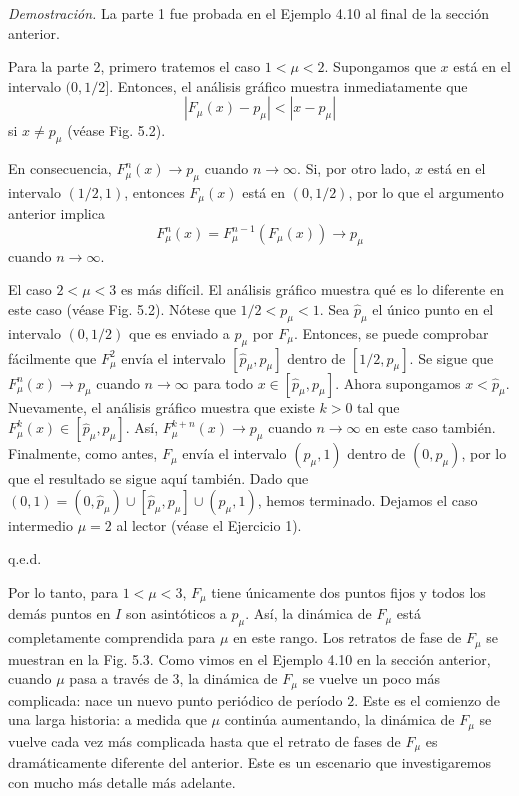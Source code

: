 \documentclass[10pt,a4paper]{book}
\begin{document}
\emph{Demostración.}  
La parte 1 fue probada en el Ejemplo 4.10 al final de la sección anterior.  

Para la parte 2, primero tratemos el caso $1<\mu<2$.  
Supongamos que $x$ está en el intervalo $(0,1/2]$.  
Entonces, el análisis gráfico muestra inmediatamente que 
\[
|F_{\mu}(x)-p_{\mu}| < |x-p_{\mu}|
\]
si $x \neq p_{\mu}$ (véase Fig. 5.2).  

En consecuencia, $F_{\mu}^{n}(x) \to p_{\mu}$ cuando $n\to\infty$.  
Si, por otro lado, $x$ está en el intervalo $(1/2,1)$, entonces $F_{\mu}(x)$ está en $(0,1/2)$, 
por lo que el argumento anterior implica
\[
F_{\mu}^{n}(x)=F_{\mu}^{n-1}(F_{\mu}(x)) \to p_{\mu}
\]
cuando $n\to\infty$.

\medskip

El caso $2<\mu<3$ es más difícil. El análisis gráfico muestra qué es lo diferente en este caso (véase Fig. 5.2). Nótese que $1/2<p_{\mu}<1$. Sea $\hat{p}_{\mu}$ el único punto en el intervalo $(0,1/2)$ que es enviado a $p_{\mu}$ por $F_{\mu}$. Entonces, se puede comprobar fácilmente que $F_{\mu}^{2}$ envía el intervalo $[\hat{p}_{\mu},p_{\mu}]$ dentro de $[1/2,p_{\mu}]$. Se sigue que $F_{\mu}^{n}(x)\to p_{\mu}$ cuando $n\to\infty$ para todo $x\in[\hat{p}_{\mu},p_{\mu}]$. Ahora supongamos $x<\hat{p}_{\mu}$. Nuevamente, el análisis gráfico muestra que existe $k>0$ tal que $F_{\mu}^{k}(x)\in[\hat{p}_{\mu},p_{\mu}]$. Así, $F_{\mu}^{k+n}(x)\to p_{\mu}$ cuando $n\to\infty$ en este caso también. Finalmente, como antes, $F_{\mu}$ envía el intervalo $(p_{\mu},1)$ dentro de $(0,p_{\mu})$, por lo que el resultado se sigue aquí también. Dado que $(0,1)=(0,\hat{p}_{\mu}) \cup [\hat{p}_{\mu},p_{\mu}] \cup (p_{\mu},1)$, hemos terminado. Dejamos el caso intermedio $\mu=2$ al lector (véase el Ejercicio 1).  

\hfill q.e.d.

\bigskip

Por lo tanto, para $1<\mu<3$, $F_{\mu}$ tiene únicamente dos puntos fijos y todos los demás puntos en $I$ son asintóticos a $p_{\mu}$. Así, la dinámica de $F_{\mu}$ está completamente comprendida para $\mu$ en este rango. Los retratos de fase de $F_{\mu}$ se muestran en la Fig. 5.3. Como vimos en el Ejemplo 4.10 en la sección anterior, cuando $\mu$ pasa a través de $3$, la dinámica de $F_{\mu}$ se vuelve un poco más complicada: nace un nuevo punto periódico de período $2$. Este es el comienzo de una larga historia: a medida que $\mu$ continúa aumentando, la dinámica de $F_{\mu}$ se vuelve cada vez más complicada hasta que el retrato de fases de $F_{\mu}$ es dramáticamente diferente del anterior. Este es un escenario que investigaremos con mucho más detalle más adelante.
\end{document}
